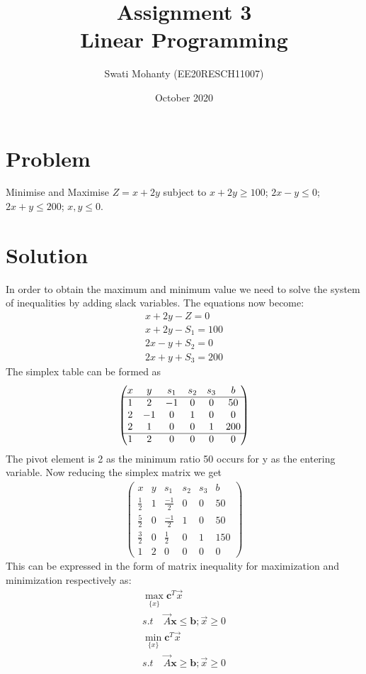 \documentclass[journal,12pt,twocolumn]{IEEEtran}
\title{Assignment 3
\\Linear Programming }
\author{Swati Mohanty (EE20RESCH11007) }
\date{October 2020}
\newcommand{\myvec}[1]{\ensuremath{\begin{pmatrix}#1\end{pmatrix}}}
\let\vec\mathbf
\begin{document}
\maketitle


\section{Problem}
Minimise and Maximise $Z=x+2y$ subject to $x+2y\geq100$; $2x-y\leq0$; $2x+y\leq200$; $x,y\leq0$.
\section{Solution}
In order to obtain the maximum and minimum value we need to solve the system of inequalities by adding slack variables. The equations now become:
\begin{align}
    x + 2y - Z =0
    \\
    x + 2y - S_1 = 100
    \\
    2x - y + S_2 = 0
    \\
    2x + y + S_3 = 200
\end{align}
The simplex table can be formed as
\begin{align}
    \myvec{x & y & s_1 & s_2 & s_3 & b \\\hline
    1 & $2$ & -1 & 0 & 0 & 50 \\
    2 & -1 & 0 & 1 & 0 & 0 \\
    2 & 1 & 0 & 0 & 1 & 200 \\\hline
    1 & 2 & 0 & 0 & 0 & 0}
\end{align}
The pivot element is 2 as the minimum ratio 50 occurs for y as the entering variable. Now reducing the simplex matrix we get
\begin{align}
    \myvec{x & y & s_1 & s_2 & s_3 & b \\\hline
    \frac{1}{2} & 1 & \frac{-1}{2} & 0 & 0 & 50 \\
    \frac{5}{2} & 0 & \frac{-1}{2} & 1 & 0 & 50 \\
    \frac{3}{2} & 0 & \frac{1}{2} & 0 & 1 & 150 \\\hline
    1 & 2 & 0 & 0 & 0 & 0}
\end{align}
This can be expressed in the form of matrix inequality for maximization and minimization respectively as:
\begin{align}
    \max_{\{x\}}\vec{c}^T\Vec{x}\\
    s.t \quad \Vec{A}\vec{x}\leq \vec{b} ; \Vec{x} \geq 0
    \\\min_{\{x\}}\vec{c}^T\Vec{x}\\
    s.t \quad \Vec{A}\vec{x}\geq \vec{b} ; \Vec{x} \geq 0
\end{align}
\end{document}
